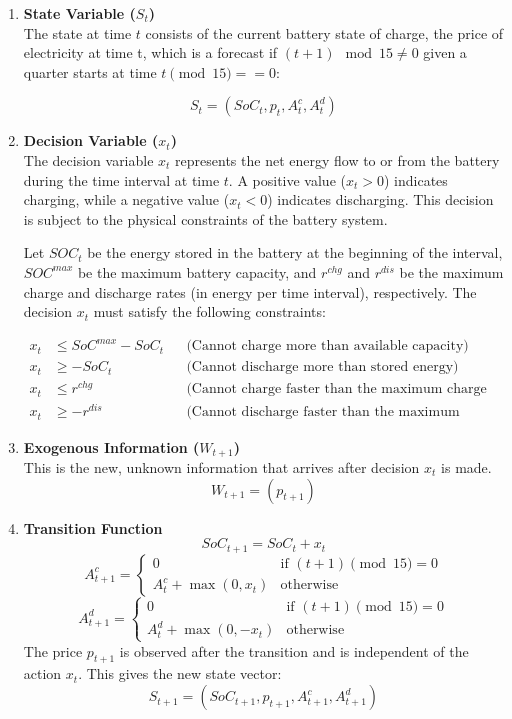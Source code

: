\begin{enumerate}
    \item \textbf{State Variable ($S_t$)} \\
    The state at time $t$ consists of the current battery state of charge, the price of electricity at time t, which is a forecast if $(t + 1) \mod 15 \neq 0$ given a quarter starts at time $t \pmod{15} == 0$:

    \[
        S_t = (SoC_t, p_t, A^{c}_{t}, A^{d}_{t})
    \]
    
    \item \textbf{Decision Variable ($x_t$)} \\
    The decision variable $x_t$ represents the net energy flow to or from the battery during the time interval at time $t$. A positive value ($x_t > 0$) indicates charging, while a negative value ($x_t < 0$) indicates discharging. This decision is subject to the physical constraints of the battery system.
    
    Let $SOC_t$ be the energy stored in the battery at the beginning of the interval, $SOC^{max}$ be the maximum battery capacity, and $r^{chg}$ and $r^{dis}$ be the maximum charge and discharge rates (in energy per time interval), respectively. The decision $x_t$ must satisfy the following constraints:
    
    \begin{align*}
        x_t &\le SoC^{max} - SoC_t && \text{(Cannot charge more than available capacity)} \\
        x_t &\ge -SoC_t && \text{(Cannot discharge more than stored energy)} \\
        x_t &\le r^{chg} && \text{(Cannot charge faster than the maximum charge rate)} \\
        x_t &\ge -r^{dis} && \text{(Cannot discharge faster than the maximum discharge rate)}    
    \end{align*}

    \item \textbf{Exogenous Information ($W_{t+1}$)} \\
    This is the new, unknown information that arrives after decision $x_t$ is made.
    \[
        W_{t+1} = (p_{t+1})
    \]

    \item \textbf{Transition Function} \\
    \[
        SoC_{t+1} = SoC_t + x_t
    \]
    \[
        A^c_{t+1} = 
        \begin{cases} 
            0 & \text{if } (t+1) \pmod{15} = 0 \\
            A^c_t + \max(0, x_t) & \text{otherwise}
        \end{cases}
    \]
    \[
        A^d_{t+1} = 
        \begin{cases} 
            0 & \text{if } (t+1) \pmod{15} = 0 \\
            A^d_t + \max(0, -x_t) & \text{otherwise}
        \end{cases}
    \]
    The price $p_{t+1}$ is observed after the transition and is independent of the action $x_t$. This gives the new state vector:
    \[ 
        S_{t+1} = (SoC_{t+1}, p_{t+1}, A^c_{t+1}, A^d_{t+1}) 
    \]


\end{enumerate}
